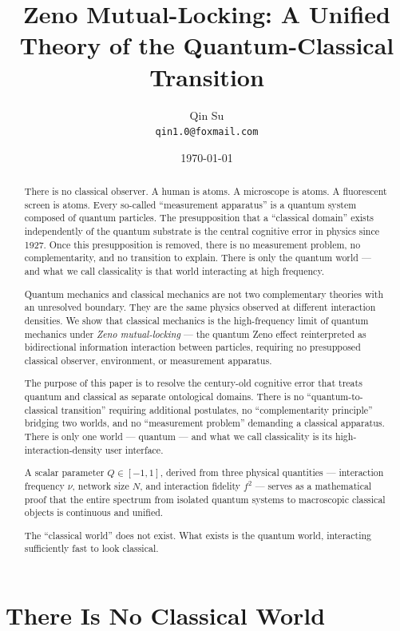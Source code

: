 \documentclass[12pt]{article}
\title{Zeno Mutual-Locking: A Unified Theory of the Quantum-Classical Transition}
\author{Qin Su \\ \texttt{qin1.0@foxmail.com}}
\date{\today}
\begin{document}
\maketitle

\begin{abstract}
There is no classical observer. A human is atoms. A microscope is atoms. A fluorescent screen is atoms. Every so-called ``measurement apparatus'' is a quantum system composed of quantum particles. The presupposition that a ``classical domain'' exists independently of the quantum substrate is the central cognitive error in physics since 1927. Once this presupposition is removed, there is no measurement problem, no complementarity, and no transition to explain. There is only the quantum world — and what we call classicality is that world interacting at high frequency.

Quantum mechanics and classical mechanics are not two complementary theories with an unresolved boundary. They are the same physics observed at different interaction densities. We show that classical mechanics is the high-frequency limit of quantum mechanics under \textit{Zeno mutual-locking} — the quantum Zeno effect reinterpreted as bidirectional information interaction between particles, requiring no presupposed classical observer, environment, or measurement apparatus.

The purpose of this paper is to resolve the century-old cognitive error that treats quantum and classical as separate ontological domains. There is no ``quantum-to-classical transition'' requiring additional postulates, no ``complementarity principle'' bridging two worlds, and no ``measurement problem'' demanding a classical apparatus. There is only one world — quantum — and what we call classicality is its high-interaction-density user interface.

A scalar parameter $Q \in [-1, 1]$, derived from three physical quantities — interaction frequency $\nu$, network size $N$, and interaction fidelity $f^2$ — serves as a mathematical proof that the entire spectrum from isolated quantum systems to macroscopic classical objects is continuous and unified.

The ``classical world'' does not exist. What exists is the quantum world, interacting sufficiently fast to look classical.
\end{abstract}

\section{There Is No Classical World}
\end{document}
